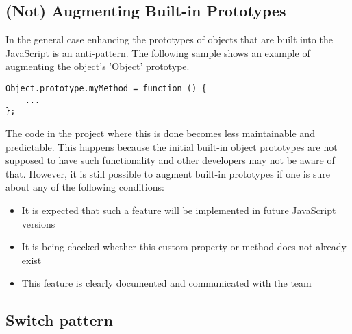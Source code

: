 \documentclass{bioinfo}
\begin{document}
\begin{methods}
\subsection{(Not) Augmenting Built-in Prototypes}
In the general case enhancing the prototypes of objects that are built into the JavaScript is an anti-pattern. The following sample shows an example of augmenting the object's 'Object' prototype.
\begin{lstlisting}
Object.prototype.myMethod = function () {
    ...
};
\end{lstlisting}
The code in the project where this is done becomes less maintainable and predictable. This happens because the initial built-in object prototypes are not supposed to have such functionality and other developers may not be aware of that.
However, it is still possible to augment built-in prototypes if one is sure about any of the following conditions:
\begin{itemize}
	\item It is expected that such a feature will be implemented in future JavaScript versions
	\item It is being checked whether this custom property or method does not already exist
	\item This feature is clearly documented and communicated with the team
\end{itemize}

\subsection{Switch pattern}


\end{methods}
\end{document}
